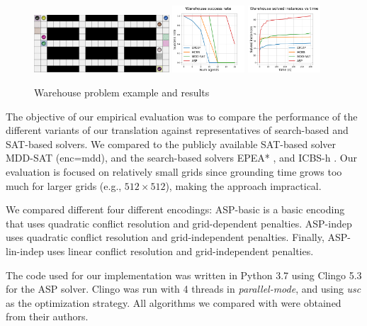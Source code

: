 \begin{figure}
    \includegraphics[width=0.45\textwidth]{graphs/warehouse.PNG}
    \includegraphics[width=0.24\textwidth]{graphs/warehousesucc.png}
    \includegraphics[width=0.24\textwidth]{graphs/warehouseruntime.png}
    \caption{Warehouse problem example and results}
    \label{fig_ware}
\end{figure}

The objective of our empirical evaluation was to compare the performance of the different variants of our translation against representatives of search-based and SAT-based solvers. We compared to the publicly available SAT-based solver MDD-SAT \cite{Surynek14} (enc=mdd), and the search-based solvers EPEA* \cite{Goldenberg14}, and ICBS-h \cite{FelnerLB00KK18}. Our evaluation is focused on relatively small grids since grounding time grows too much for larger grids (e.g., $512\times 512$), making the approach impractical.


We compared different four different encodings: ASP-basic is a basic encoding that uses quadratic conflict resolution and grid-dependent penalties. ASP-indep uses quadratic conflict resolution and grid-independent penalties. Finally, ASP-lin-indep uses linear conflict resolution and grid-independent penalties. 

The code used for our implementation was written in Python 3.7 using Clingo 5.3 \cite{GebserKKS14} for the ASP solver. Clingo was run with 4 threads in \textit{parallel-mode}, and using \textit{usc} as the optimization strategy. All algorithms we compared with were obtained from their authors.

